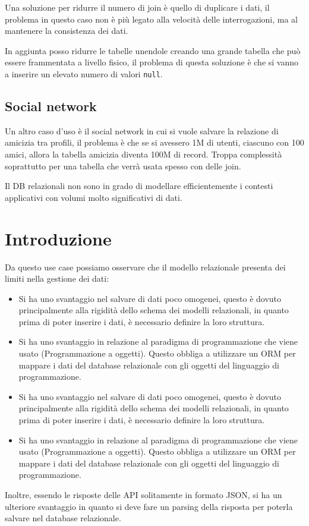 Una soluzione per ridurre il numero di join è quello di duplicare i dati, il
problema in questo caso non è più legato alla velocità delle interrogazioni, ma
al mantenere la consistenza dei dati.

In aggiunta posso ridurre le tabelle unendole creando una grande tabella che può
essere frammentata a livello fisico, il problema di questa soluzione è che si
vanno a inserire un elevato numero di valori \texttt{null}.
\subsection*{Social network}
Un altro caso d'uso è il social network in cui si vuole salvare la relazione di
amicizia tra profili, il problema è che se si avessero 1M di utenti, ciascuno con
100 amici, allora la tabella amicizia diventa 100M di record. Troppa complessità
soprattutto per una tabella che verrà usata spesso con delle join.

Il DB relazionali non sono in grado di modellare efficientemente i contesti applicativi
con volumi molto significativi di dati.
\section{Introduzione}
Da questo use case possiamo osservare che il modello relazionale presenta dei
limiti nella gestione dei dati:
\begin{itemize}
      \item Si ha uno svantaggio nel salvare di dati poco omogenei, questo è dovuto
            principalmente alla rigidità dello schema dei modelli relazionali, in
            quanto prima di poter inserire i dati, è necessario definire la loro
            struttura.
      \item Si ha uno svantaggio in relazione al paradigma di programmazione che
            viene usato (Programmazione a oggetti). Questo obbliga a utilizzare
            un ORM per mappare i dati del database relazionale con gli oggetti
            del linguaggio di programmazione.
      \item Si ha uno svantaggio nel salvare di dati poco omogenei, questo è dovuto
            principalmente alla rigidità dello schema dei modelli relazionali, in
            quanto prima di poter inserire i dati, è necessario definire la loro
            struttura.
      \item Si ha uno svantaggio in relazione al paradigma di programmazione che
            viene usato (Programmazione a oggetti). Questo obbliga a utilizzare
            un ORM per mappare i dati del database relazionale con gli oggetti
            del linguaggio di programmazione.
\end{itemize}
Inoltre, essendo le risposte delle API solitamente in formato JSON, si ha un
ulteriore svantaggio in quanto si deve fare un parsing della risposta per
poterla salvare nel database relazionale.

